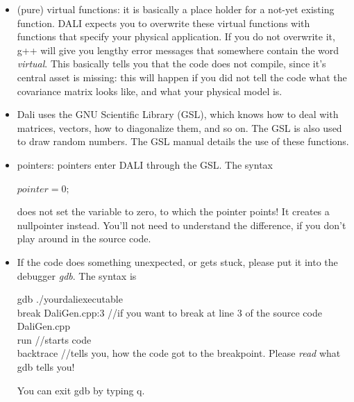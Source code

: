 \documentclass[12pt,twoside]{extarticle}
\newenvironment{exercise}{\begin{eBox}}{\hfill{\color{daliblue}}\end{eBox}}
\newenvironment{file}{\begin{fBox}}{\hfill{\color{dalifile}}\end{fBox}}
\begin{document}
\begin{itemize}
\item (pure) virtual functions: it is basically a place holder for a not-yet existing function. DALI expects you to overwrite these virtual functions with functions that specify your physical application. If you do not overwrite it, g++ will give you lengthy error messages that somewhere contain the word \emph{virtual}. This basically tells you that the code does not compile, since it's central asset is missing: this will happen if you did not tell the code what the covariance matrix looks like, and what your physical model is.
\item Dali uses the GNU Scientific Library (GSL), which knows how to deal with matrices, vectors, how to diagonalize them, and so on. The GSL is also used to draw random numbers. The GSL manual details the use of these functions.
\item pointers: pointers enter DALI through the GSL. The syntax
\begin{file}
 $pointer = 0;$
\end{file}
does not set the variable to zero, to which the pointer points! It creates a nullpointer instead. You'll not need to understand the difference, if you don't play around in the source code.
\item If the code does something unexpected, or gets stuck, please put it into the debugger \emph{gdb}. The syntax is\\
\begin{exercise}
 gdb ./yourdaliexecutable\\
break DaliGen.cpp:3                   \textcolor{daliblue!70}{//if you want to break at line 3 of the source code DaliGen.cpp}\\
run                                   \textcolor{daliblue!70}{//starts code}\\
backtrace                             \textcolor{daliblue!70}{//tells you, how the code got to the breakpoint. Please \emph{read} what gdb tells you!}\\
\end{exercise}
You can exit gdb by typing q.
\end{itemize}
\end{document}
